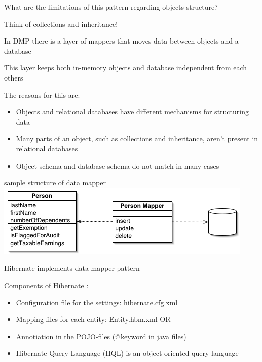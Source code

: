 \documentclass{beamer}
\begin{document}
\begin{slide}{
\item What are the limitations of this pattern regarding objects structure? 
\pause
\item Think of collections and inheritance! 
}\end{slide}

\begin{slide}{
\item In DMP there is a layer of mappers that moves data between objects and a database 
\item This layer keeps both in-memory objects and database independent from each others 
\item The reasons for this are:
\pause
\begin{itemize}
\item Objects and relational databases have different mechanisms for structuring data
\pause
\item Many parts of an object, such as collections and inheritance, aren't present in relational databases
\item Object schema and database schema do not match in many cases
\end{itemize}
}\end{slide}

\begin{slide}{
\item sample structure of data mapper 
\\
\includegraphics[scale=0.5]{img/databaseMapperSketch.png}
}\end{slide}


\begin{slide}{
\item Hibernate implements data mapper pattern
\item Components of Hibernate : 	
\begin{itemize}
\item Configuration file for the settings: hibernate.cfg.xml 
\pause
\item Mapping files for each entity: Entity.hbm.xml OR
\pause 
\item Annotiation in the POJO-files (@keyword in java files)
\pause
\item Hibernate Query Language (HQL) is an object-oriented query language
\end{itemize}
}\end{slide}
\end{document}

